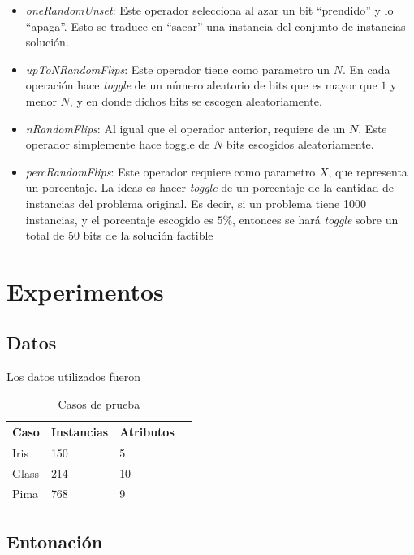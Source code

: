\documentclass[11pt]{article}
\begin{document}
\begin{itemize}
  \item \emph{oneRandomUnset}:
    Este operador selecciona al
    azar un bit ``prendido'' y lo ``apaga''. Esto se traduce
    en ``sacar'' una instancia del conjunto de instancias solución.
  \item \emph{upToNRandomFlips}: Este operador tiene como parametro
    un $N$. En cada operación hace \emph{toggle} de un número aleatorio 
    de bits que es mayor que $1$ y menor $N$, y en donde dichos bits 
    se escogen aleatoriamente.
  \item \emph{nRandomFlips}: Al igual que el operador anterior, 
    requiere de un $N$. Este operador simplemente hace toggle de $N$ bits 
    escogidos aleatoriamente.
  \item \emph{percRandomFlips}: Este operador requiere como parametro $X$, que 
    representa un porcentaje. La ideas es hacer \emph{toggle} de un porcentaje de la
    cantidad de instancias del problema original. Es decir, si un problema tiene 1000
    instancias, y el porcentaje escogido es $5 \%$, entonces se hará \emph{toggle} 
    sobre un total de 50 bits de la solución factible
\end{itemize}

\section{Experimentos}

\subsection{Datos}

Los datos utilizados fueron

\begin{table}[h]
\begin{tabular}{ |l|l|l|l| }
    \hline
    Caso    & Instancias & Atributos \\ \hline
    Iris & 150 & 5 \\ \hline
    Glass & 214 & 10 \\ \hline
    Pima & 768 & 9 \\ \hline
\end{tabular}
\caption{Casos de prueba}
\label{tabla:1}
\end{table}

\subsection{Entonación}
\end{document}
